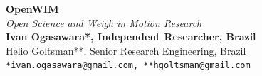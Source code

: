 \documentclass[a0,portrait]{a0poster}
\begin{document}


\begin{minipage}[b]{0.75\linewidth}
\veryHuge \color{black} \textbf{OpenWIM} \color{Black}\\ %
\Huge\textit{Open Science and Weigh in Motion Research}\\[2cm] %
\huge \textbf{Ivan Ogasawara*, Independent Researcher, Brazil}\\[0.5cm] %
\huge Helio Goltsman**, Senior Research Engineering, Brazil\\[0.4cm] %
\Large \texttt{*ivan.ogasawara@gmail.com, **hgoltsman@gmail.com}\\
\end{minipage}
%


\end{document}
